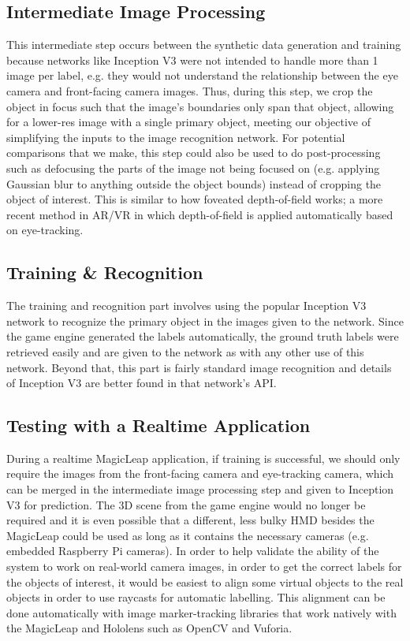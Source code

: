 \subsection{Intermediate Image Processing}
This intermediate step occurs between the synthetic data generation and training because networks like Inception V3 were not intended to handle more than 1 image per label, e.g. they would not understand the relationship between the eye camera and front-facing camera images. Thus, during this step, we crop the object in focus such that the image's boundaries only span that object, allowing for a lower-res image with a single primary object, meeting our objective of simplifying the inputs to the image recognition network. For potential comparisons that we make, this step could also be used to do post-processing such as defocusing the parts of the image not being focused on (e.g. applying Gaussian blur to anything outside the object bounds) instead of cropping the object of interest. This is similar to how foveated depth-of-field works; a more recent method in AR/VR in which depth-of-field is applied automatically based on eye-tracking.
\subsection{Training \& Recognition}
The training and recognition part involves using the popular Inception V3 network to recognize the primary object in the images given to the network. Since the game engine generated the labels automatically, the ground truth labels were retrieved easily and are given to the network as with any other use of this network. Beyond that, this part is fairly standard image recognition and details of Inception V3 are better found in that network's API.
\subsection{Testing with a Realtime Application}
During a realtime MagicLeap application, if training is successful, we should only require the images from the front-facing camera and eye-tracking camera, which can be merged in the intermediate image processing step and given to Inception V3 for prediction. The 3D scene from the game engine would no longer be required and it is even possible that a different, less bulky HMD besides the MagicLeap could be used as long as it contains the necessary cameras (e.g. embedded Raspberry Pi cameras). 
\newline\indent In order to help validate the ability of the system to work on real-world camera images, in order to get the correct labels for the objects of interest, it would be easiest to align some virtual objects to the real objects in order to use raycasts for automatic labelling. This alignment can be done automatically with image marker-tracking libraries that work natively with the MagicLeap and Hololens such as OpenCV and Vuforia.